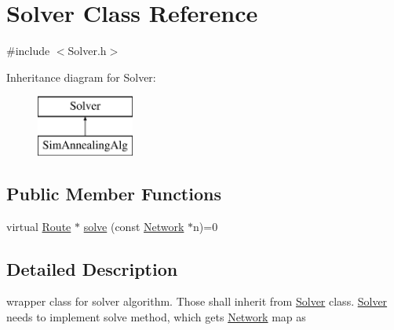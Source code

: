 \hypertarget{classSolver}{\section{Solver Class Reference}
\label{classSolver}
}


{\ttfamily \#include $<$Solver.\+h$>$}

Inheritance diagram for Solver\+:\begin{figure}[H]
\begin{center}
\leavevmode
\includegraphics[height=2.000000cm]{classSolver}
\end{center}
\end{figure}
\subsection*{Public Member Functions}
\begin{DoxyCompactItemize}
\item 
virtual \hyperlink{classRoute}{Route} $\ast$ \hyperlink{classSolver_ad5eb692895667e7a529bffa5895bf6cc}{solve} (const \hyperlink{classNetwork}{Network} $\ast$n)=0
\end{DoxyCompactItemize}


\subsection{Detailed Description}
wrapper class for solver algorithm. Those shall inherit from \hyperlink{classSolver}{Solver} class. \hyperlink{classSolver}{Solver} needs to implement solve method, which gets \hyperlink{classNetwork}{Network} map as 

